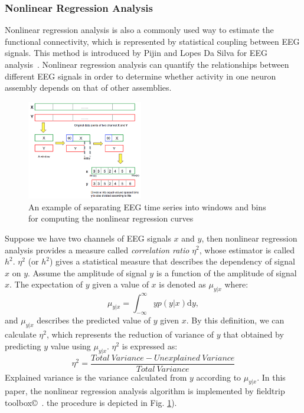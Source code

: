 \subsubsection{Nonlinear Regression Analysis}
Nonlinear regression analysis is also a commonly used way to estimate the functional connectivity, which is represented by statistical coupling between EEG signals. This method is introduced by Pijin and Lopes Da Silva for EEG analysis~\cite{pijn1990localization}. Nonlinear regression analysis can quantify the relationships between different EEG signals in order to determine whether activity in one neuron assembly depends on that of other assemblies.
\begin{figure}[!t]
    \centering
    \includegraphics[width=0.45\textwidth]{./images/binsepa.png}
    \caption{An example of separating EEG time series into windows and bins for computing the nonlinear regression curves}
    \label{fig:bin}
\end{figure}
Suppose we have two channels of EEG signals $x$ and $y$, then nonlinear regression analysis provides a measure called \emph{correlation ratio} $\eta^2$, whose estimator is called $h^2$. $\eta^2$ (or $h^2$) gives a statistical measure that describes the dependency of signal $x$ on $y$. Assume the amplitude of signal $y$ is a function of the amplitude of signal $x$. The expectation of $y$ given a value of $x$ is denoted as $\mu_{y|x}$ where:
\begin{equation} \label{eq:regressioncurve}
\mu_{y|x} = \int_{-\infty}^{\infty} y p(y|x) \mathrm{d}y,
\end{equation}
and $\mu_{y|x}$ describes the predicted value of $y$ given $x$. By this definition, we can calculate $\eta^2$, which represents the reduction of variance of $y$ that obtained by predicting $y$ value using $\mu_{y|x}$. $\eta^2$ is expressed as:
\begin{equation} \label{eq:NRAregression}
\eta^2 = \frac{Total \ Variance - Unexplained \ Variance}{Total \ Variance}
\end{equation}
Explained variance is the variance calculated from $y$ according to $\mu_{y|x}$. In this paper, the nonlinear regression analysis algorithm is implemented by fieldtrip toolbox\copyright~\cite{oostenveld2010fieldtrip}. the procedure is depicted in Fig. \ref{fig:bin}).

